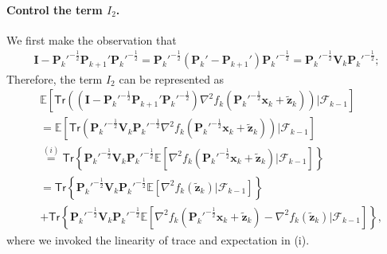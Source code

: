 \paragraph{Control the term $I_2$.} We first make the observation that
\begin{align*}
\bm{I}-\bm{P}_k'^{-\frac{1}{2}}\bm{P}_{k+1}'\bm{P}_k'^{-\frac{1}{2}}=\bm{P}_k'^{-\frac{1}{2}}(\bm{P}_k'-\bm{P}_{k+1}')\bm{P}_k'^{-\frac{1}{2}}=\bm{P}_k'^{-\frac{1}{2}}\bm{V}_k\bm{P}_k'^{-\frac{1}{2}};
\end{align*}
Therefore, the term $I_2$ can be represented as
\begin{align}\label{eq:Srikant-I2}
&\mathbb{E}\left[\mathsf{Tr}\left(\left(\bm{I}-\bm{P}_k'^{-\frac{1}{2}}\bm{P}_{k+1}'\bm{P}_k'^{-\frac{1}{2}}\right)\nabla^2 f_k(\bm{P}_k'^{-\frac{1}{2}}\bm{x}_k + \tilde{\bm{z}}_k)\right)\bigg|\mathscr{F}_{k-1}\right] \nonumber\\ 
&= \mathbb{E}\left[\mathsf{Tr}\left(\bm{P}_k'^{-\frac{1}{2}}\bm{V}_k\bm{P}_k'^{-\frac{1}{2}} \nabla^2 f_k(\bm{P}_k'^{-\frac{1}{2}}\bm{x}_k + \tilde{\bm{z}}_k)\right)\bigg|\mathscr{F}_{k-1}\right]\nonumber\\ 
&\overset{(i)}{=}\mathsf{Tr}\left\{\bm{P}_k'^{-\frac{1}{2}}\bm{V}_k\bm{P}_k'^{-\frac{1}{2}}\mathbb{E}\left[\nabla^2 f_k(\bm{P}_k'^{-\frac{1}{2}}\bm{x}_k + \tilde{\bm{z}}_k)\bigg|\mathscr{F}_{k-1}\right]\right\} \nonumber\\ 
&= \mathsf{Tr}\left\{\bm{P}_k'^{-\frac{1}{2}}\bm{V}_k\bm{P}_k'^{-\frac{1}{2}}\mathbb{E}\left[\nabla^2 f_k(\tilde{\bm{z}}_k)\bigg|\mathscr{F}_{k-1}\right]\right\}\nonumber \\ 
&+ \mathsf{Tr}\left\{\bm{P}_k'^{-\frac{1}{2}}\bm{V}_k\bm{P}_k'^{-\frac{1}{2}}\mathbb{E}\left[\nabla^2 f_k(\bm{P}_k'^{-\frac{1}{2}}\bm{x}_k + \tilde{\bm{z}}_k)-\nabla^2 f_k(\tilde{\bm{z}}_k)\bigg|\mathscr{F}_{k-1}\right]\right\},
\end{align}
where we invoked the linearity of trace and expectation in (i). 


